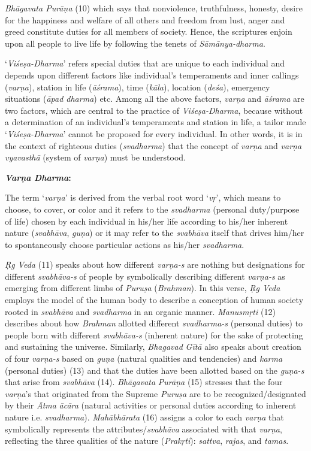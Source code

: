 \emph{Bhāgavata Purāṇa} (10) which says that nonviolence, truthfulness, honesty, desire for the happiness and welfare of all others and freedom from lust, anger and greed constitute duties for all members of society. Hence, the scriptures enjoin upon all people to live life by following the tenets of \emph{Sāmānya-dharma}.
\eject

`\emph{Viśeṣa-Dharma}' refers special duties that are unique to each individual and depends upon different factors like individual's temperaments and inner callings (\emph{varṇa}), station in life (\emph{āśrama}), time (\emph{kāla}), location (\emph{deśa}), emergency situations (\emph{āpad dharma}) etc. Among all the above factors, \emph{varṇa} and \emph{āśrama} are two factors, which are central to the practice of \emph{Viśeṣa-Dharma}, because without a determination of an individual's temperaments and station in life, a tailor made `\emph{Viśeṣa-Dharma}' cannot be proposed for every individual. In other words, it is in the context of righteous duties (\emph{svadharma}) that the concept of \emph{varṇa} and \emph{varṇa} \emph{vyavasthā} (system of \emph{varṇa}) must be understood.

\textbf{\emph{Varṇa} \emph{Dharma}:}

The term `\emph{varṇa}' is derived from the verbal root word `\emph{vṛ}', which means to choose, to cover, or color and it refers to the \emph{svadharma} (personal duty/purpose of life) chosen by each individual in his/her life according to his/her inherent nature (\emph{svabhāva}, \emph{guṇa}) or it may refer to the \emph{svabhāva} itself that drives him/her to spontaneously choose particular actions as his/her \emph{svadharma}.

\emph{Ṛg Veda} (11) speaks about how different \emph{varṇa-s} are nothing but designations for different \emph{svabhāva-s} of people by symbolically describing different \emph{varṇa-s} as emerging from different limbs of \emph{Puruṣa} (\emph{Brahman}). In this verse, \emph{Ṛg Veda} employs the model of the human body to describe a conception of human society rooted in \emph{svabhāva} and \emph{svadharma} in an organic manner. \emph{Manusmṛti} (12) describes about how \emph{Brahman} allotted different \emph{svadharma-s} (personal duties) to people born with different \emph{svabhāva-s} (inherent nature) for the sake of protecting and sustaining the universe. Similarly, \emph{Bhagavad} \emph{Gītā} also speaks about creation of four \emph{varṇa-s} based on \emph{guṇa} (natural qualities and tendencies) and \emph{karma} (personal duties) (13) and that the duties have been allotted based on the \emph{guṇa-s} that arise from \emph{svabhāva} (14). \emph{Bhāgavata} \emph{Purāṇa} (15) stresses that the four \emph{varṇa}'s that originated from the Supreme \emph{Puruṣa} are to be recognized/designated by their \emph{Ātma} \emph{ācāra} (natural activities or personal duties according to inherent nature i.e. \emph{svadharma}). \emph{Mahābhārata} (16) assigns a color to each \emph{varṇa} that symbolically represents the attributes/\emph{svabhāva} associated with that \emph{varṇa}, reflecting the three qualities of the nature (\emph{Prakṛti}): \emph{sattva}, \emph{rajas}, and \emph{tamas}.

